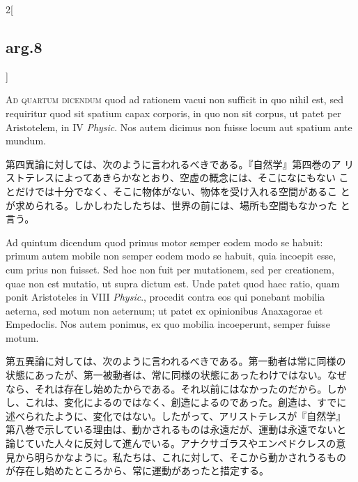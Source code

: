 \documentclass[paper=a4paper,fontsize=10pt,jafontsize=9pt,titlepage]{jlreq}
\begin{document}
\begin{paracol}{2}[\subsection{arg.8}]
\switchcolumn*[\subsection{ad.4}]


{\scshape Ad quartum dicendum} quod ad rationem vacui non sufficit in quo nihil
 est, sed requiritur quod sit spatium capax corporis, in quo non sit
 corpus, ut patet per Aristotelem, in IV {\itshape Physic}. Nos autem dicimus non
 fuisse locum aut spatium ante mundum.


\switchcolumn


第四異論に対しては、次のように言われるべきである。『自然学』第四巻のア
リストテレスによってあきらかなとおり、空虚の概念には、そこになにもない
ことだけでは十分でなく、そこに物体がない、物体を受け入れる空間があるこ
とが求められる。しかしわたしたちは、世界の前には、場所も空間もなかった
と言う。


\switchcolumn*[\subsection{ad.5}]


Ad quintum dicendum quod primus motor semper eodem modo se habuit: primum
 autem mobile non semper eodem modo se habuit, quia incoepit esse, cum
 prius non fuisset. Sed hoc non fuit per mutationem, sed per creationem,
 quae non est mutatio, ut supra dictum est. Unde patet quod haec ratio,
 quam ponit Aristoteles in VIII {\itshape Physic}., procedit contra eos qui
 ponebant mobilia aeterna, sed motum non aeternum; ut patet ex
 opinionibus Anaxagorae et Empedoclis. Nos autem ponimus, ex quo mobilia
 incoeperunt, semper fuisse motum.


\switchcolumn


第五異論に対しては、次のように言われるべきである。第一動者は常に同様の
状態にあったが、第一被動者は、常に同様の状態にあったわけではない。なぜ
なら、それは存在し始めたからである。それ以前にはなかったのだから。しか
し、これは、変化によるのではなく、創造によるのであった。創造は、すでに
述べられたように、変化ではない。したがって、アリストテレスが『自然学』
第八巻で示している理由は、動かされるものは永遠だが、運動は永遠でないと
論じていた人々に反対して進んでいる。アナクサゴラスやエンペドクレスの意
見から明らかなように。私たちは、これに対して、そこから動かされうるもの
が存在し始めたところから、常に運動があったと措定する。


\switchcolumn*[\subsection{ad.6}]



\end{paracol}
\end{document}
